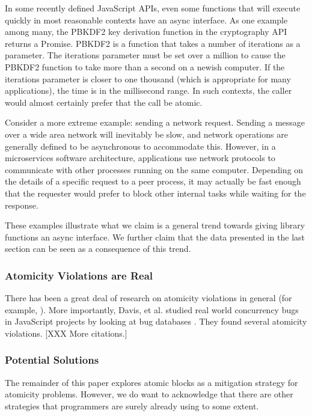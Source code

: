 \documentclass[acmsmall,anonymous,review]{acmart}\settopmatter{printfolios=true,printccs=false,printacmref=false}
\begin{document}
In some recently defined JavaScript APIs, even some functions that will execute quickly in most reasonable contexts have an async interface.
As one example among many, the PBKDF2 key derivation function in the cryptography API returns a Promise.
PBKDF2 is a function that takes a number of iterations as a parameter.
The iterations parameter must be set over a million to cause the PBKDF2 function to take more than a second on a newish computer.
If the iterations parameter is closer to one thousand (which is appropriate for many applications), the time is in the millisecond range.
In such contexts, the caller would almost certainly prefer that the call be atomic.

Consider a more extreme example: sending a network request.
Sending a message over a wide area network will inevitably be slow, and network operations are generally defined to be asynchronous to accommodate this.
However, in a microservices software architecture, applications use network protocols to communicate with other processes running on the same computer.
Depending on the details of a specific request to a peer process, it may actually be fast enough that the requester would prefer to block other internal tasks while waiting for the response.

These examples illustrate what we claim is a general trend towards giving library functions an async interface.
We further claim that the data presented in the last section can be seen as a consequence of this trend.

\subsubsection{Atomicity Violations are Real}

There has been a great deal of research on atomicity violations in general (for example, \cite{Lu2008}).
More importantly, Davis, et al. studied real world concurrency bugs in JavaScript projects by looking at bug databases \cite{Davis2017}.
They found several atomicity violations.
[XXX More citations.]

\subsubsection{Potential Solutions}

The remainder of this paper explores atomic blocks as a mitigation strategy for atomicity problems.
However, we do want to acknowledge that there are other strategies that programmers are surely already using to some extent.
\end{document}
